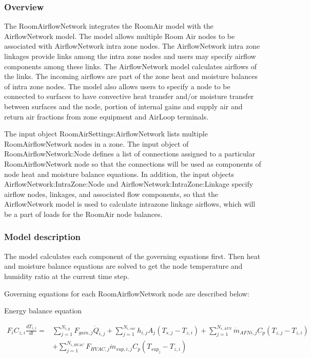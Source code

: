 \subsubsection{Overview}\label{overview-4-001}

The RoomAirflowNetwork integrates the RoomAir model with the AirflowNetwork model. The model allows multiple Room Air nodes to be associated with AirflowNetwork intra zone nodes. The AirflowNetwork intra zone linkages provide links among the intra zone nodes and users may specify airflow components among these links. The AirflowNetwork model calculates airflows of the links. The incoming airflows are part of the zone heat and moisture balances of intra zone nodes. The model also allows users to specify a node to be connected to surfaces to have convective heat transfer and/or moisture transfer between surfaces and the node, portion of internal gains and supply air and return air fractions from zone equipment and AirLoop terminals.

The input object RoomAirSettings:AirflowNetwork lists multiple RoomAirflowNetwork nodes in a zone. The input object of RoomAirflowNetwork:Node defines a list of connections assigned to a particular RoomAirflowNetwork node so that the connections will be used as components of node heat and moisture balance equations. In addition, the input objects AirflowNetwork:IntraZone:Node and AirflowNetwork:IntraZone:Linkage specify airflow nodes, linkages, and associated flow components, so that the AirflowNetwork model is used to calculate intrazone linkage airflows, which will be a part of loads for the RoomAir node balances.

\subsubsection{Model description}\label{model-description-3-001}

The model calculates each component of the governing equations first. Then heat and moisture balance equations are solved to get the node temperature and humidity ratio at the current time step.

Governing equations for each RoomAirflowNetwork node are described below:

Energy balance equation

\begin{equation}
\begin{split}
{F_i}{C_{z,i}}\frac{{d{T_{z,i}}}}{{dt}} =& \sum\limits_{j = 1}^{{N_{i,g}}} {{F_{gain,j}{\dot Q}_{i,j}}}  + \sum\limits_{j = 1}^{{N_{i,sur}}} {{h_{i,j}}} {A_j}\left( {{T_{s,j}} - {T_{z,i}}} \right) + \sum\limits_{j = 1}^{{N_{i,AFN}}} {{{\dot m}_{AFN i,j}}} {C_p}\left( {{T_{z,j}} - {T_{z,i}}} \right)\, \\
&+ \sum\limits_{j = 1}^{{N_{i,HVAC}}} {{{F_{HVAC,j}}{\dot m}_{sup,i,j}}} {C_p}\left( {{T_{sup_j}} - {T_{z,i}}} \right)
\end{split}
\end{equation}

